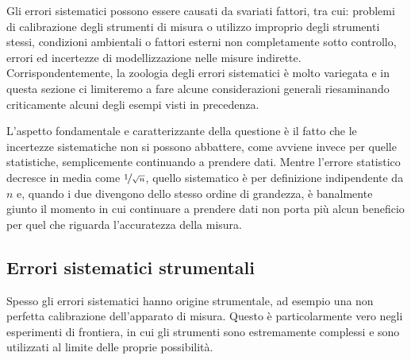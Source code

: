 Gli errori sistematici possono essere causati da svariati fattori, tra cui:
problemi di calibrazione degli strumenti di misura o utilizzo improprio degli
strumenti stessi, condizioni ambientali o fattori esterni non completamente
sotto controllo, errori ed incertezze di modellizzazione nelle misure indirette.
Corrispondentemente, la zoologia degli errori sistematici è molto variegata e
in questa sezione ci limiteremo a fare alcune considerazioni generali
riesaminando criticamente alcuni degli esempi visti in precedenza.


L'aspetto fondamentale e caratterizzante della questione è il fatto che le
incertezze sistematiche non si possono abbattere, come avviene invece per quelle
statistiche, semplicemente continuando a prendere dati. Mentre l'errore
statistico decresce in media come $\nicefrac{1}{\sqrt{n}}$, quello sistematico
è per definizione indipendente da $n$ e, quando i due divengono dello stesso
ordine di grandezza, è banalmente giunto il momento in cui continuare a
prendere dati non porta più alcun beneficio per quel che riguarda
l'accuratezza della misura.


\subsection{Errori sistematici strumentali}

Spesso gli errori sistematici hanno origine strumentale, ad esempio una non
perfetta calibrazione dell'apparato di misura. Questo è particolarmente vero
negli esperimenti di frontiera, in cui gli strumenti sono estremamente
complessi e sono utilizzati al limite delle proprie possibilità.


